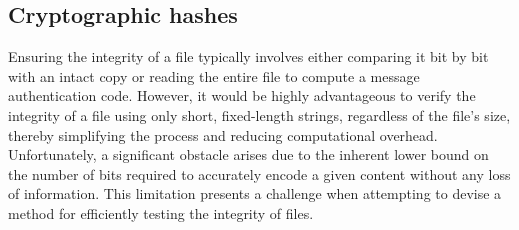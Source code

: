 \subsection{Cryptographic hashes}
Ensuring the integrity of a file typically involves either comparing it bit by bit with an intact copy or reading the entire file to compute a message authentication code.
However, it would be highly advantageous to verify the integrity of a file using only short, fixed-length strings, regardless of the file's size, thereby simplifying the process and reducing computational overhead.
Unfortunately, a significant obstacle arises due to the inherent lower bound on the number of bits required to accurately encode a given content without any loss of information. 
This limitation presents a challenge when attempting to devise a method for efficiently testing the integrity of files.